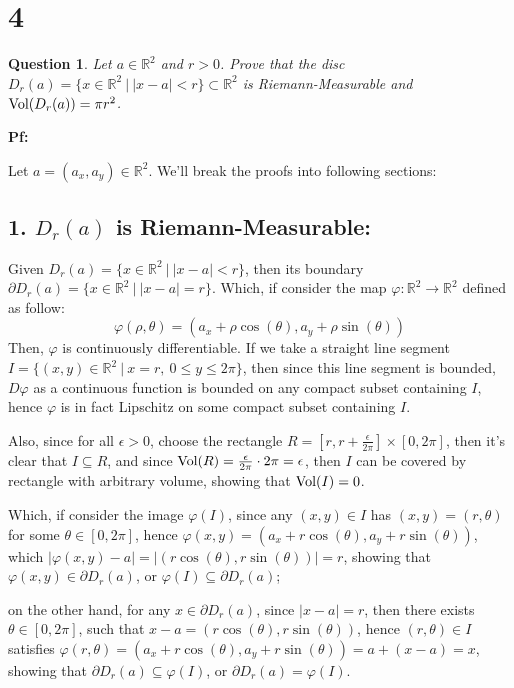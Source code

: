 \documentclass{article}
\newtheorem{question}{Question}
\begin{document}
\break

\section*{4}
\begin{myBox}[]{}
    \begin{question}
        Let $a\in\mathbb{R}^2$ and $r>0$. Prove that the disc $D_r(a)=\{x\in\mathbb{R}^2\ |\ |x-a|<r\}\subset\mathbb{R}^2$ is Riemann-Measurable and $\textmd{Vol}(D_r(a))=\pi r^2$.
    \end{question}
\end{myBox}

\textbf{Pf:}

Let $a = (a_x,a_y)\in\mathbb{R}^2$. We'll break the proofs into following sections:
\subsection*{1. $D_r(a)$ is Riemann-Measurable:}
Given $D_r(a)=\{x\in\mathbb{R}^2\ |\ |x-a|<r\}$, then its boundary $\partial D_r(a) = \{x\in\mathbb{R}^2\ |\ |x-a|=r\}$. Which, if consider the map $\varphi:\mathbb{R}^2\rightarrow\mathbb{R}^2$ defined as follow:
\begin{equation}
    \varphi(\rho,\theta) = (a_x+\rho\cos(\theta),a_y+\rho\sin(\theta))
\end{equation}
Then, $\varphi$ is continuously differentiable. If we take a straight line segment $I = \{(x,y)\in\mathbb{R}^2\ |\ x=r,\ 0\leq y\leq 2\pi\}$, then since this line segment is bounded, $D\varphi$ as a continuous function is bounded on any compact subset containing $I$, hence $\varphi$ is in fact Lipschitz on some compact subset containing $I$.

Also, since for all $\epsilon>0$, choose the rectangle $R=[r,r+\frac{\epsilon}{2\pi}]\times [0,2\pi]$, then it's clear that $I\subseteq R$, and since $\textmd{Vol}(R) = \frac{\epsilon}{2\pi}\cdot 2\pi = \epsilon$, then $I$ can be covered by rectangle with arbitrary volume, showing that $\textmd{Vol}(I)=0$.

Which, if consider the image $\varphi(I)$, since any $(x,y)\in I$ has $(x,y)=(r,\theta)$ for some $\theta\in [0,2\pi]$, hence $\varphi(x,y)=(a_x+r\cos(\theta),a_y+r\sin(\theta))$, which $|\varphi(x,y)-a| = |(r\cos(\theta),r\sin(\theta))| = r$, showing that $\varphi(x,y)\in \partial D_r(a)$, or $\varphi(I)\subseteq \partial D_r(a)$; 

on the other hand, for any $x\in \partial D_r(a)$, since $|x-a|=r$, then there exists $\theta\in[0,2\pi]$, such that $x-a = (r\cos(\theta),r\sin(\theta))$, hence $(r,\theta)\in I$ satisfies $\varphi(r,\theta)=(a_x+r\cos(\theta),a_y+r\sin(\theta)) = a+(x-a) = x$, showing that $\partial D_r(a)\subseteq \varphi(I)$, or $\partial D_r(a)=\varphi(I)$.
\end{document}
